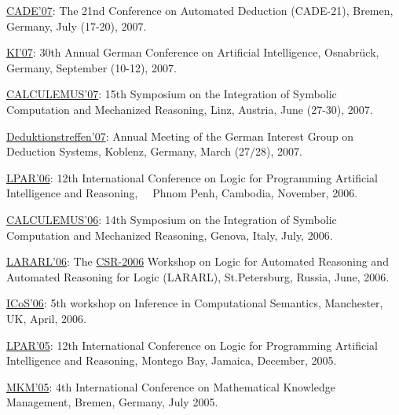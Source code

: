 \documentclass{letter}
\begin{document}
  \item \href{http://www.cadeconference.org/meetings/cade21}{CADE'07}: The
  21nd Conference on Automated Deduction (CADE-21), Bremen, Germany, July
  (17-20), 2007.
  
  \item \href{http://www.ki2007.uos.de/}{KI'07}: 30th Annual German Conference
  on Artificial Intelligence, Osnabr\"uck, Germany, September (10-12), 2007.
  
  \item \href{}{CALCULEMUS'07}: 15th Symposium on the Integration of Symbolic
  Computation and Mechanized Reasoning{\small , Linz, Austria, }June (27-30),
  2007.
  
  \item \href{http://www.cs.bham.ac.uk/\~{
  }mmk/events/deduktionstreffen07/}{Deduktionstreffen'07}: Annual Meeting of
  the German Interest Group on Deduction Systems, Koblenz, Germany, March
  (27/28), 2007.
  
  \item \href{http://www.lix.polytechnique.fr/\~{
  }hermann/LPAR2006/}{LPAR'06}: 12th International Conference on Logic for
  Programming Artificial Intelligence and Reasoning, \ \ Phnom Penh, Cambodia,
  November, 2006.
  
  \item \href{http://calculemus2006.loria.fr/}{CALCULEMUS'06}: 14th Symposium
  on the Integration of Symbolic Computation and Mechanized Reasoning{\small ,
  Genova, Italy, }July, 2006.
  
  \item \href{http://www.cs.miami.edu/\~{
  }geoff/Conferences/LARARL/}{LARARL'06}: The
  \href{http://logic.pdmi.ras.ru/\~{ }csr2006/}{CSR-2006} Workshop on Logic
  for Automated Reasoning and Automated Reasoning for Logic (LARARL),
  St.Petersburg, Russia, June, 2006.
  
  \item \href{http://www.cs.man.ac.uk/\~{ }ipratt/ICoS-5/}{ICoS'06}: 5th
  workshop on Inference in Computational Semantics, Manchester, UK, April,
  2006.
  
  \item \href{http://www.lpar.net/2005/}{LPAR'05}: 12th International
  Conference on Logic for Programming Artificial Intelligence and Reasoning,
  Montego Bay, Jamaica, December, 2005.
  
  \item \href{http://www.mkm-ig.org/meetings/mkm05/}{MKM'05}: 4th
  International Conference on Mathematical Knowledge Management, Bremen,
  Germany, July 2005.
  
\end{document}
